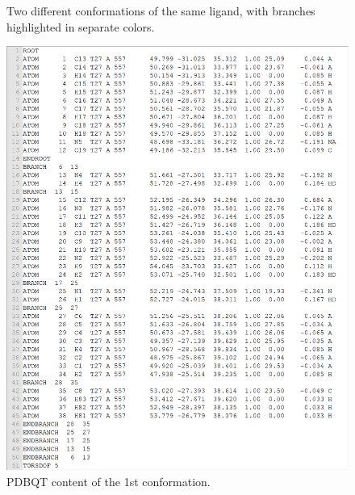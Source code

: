 \begin{figure}
\centering
{}
\caption{Two different conformations of the same ligand, with branches highlighted in separate colors.}
\label{usr:T27Structures}
\end{figure}

\begin{figure}
\centering
\includegraphics[width=\linewidth]{../usrt/T27CrystalPDBQT.png}
\caption{PDBQT content of the 1st conformation.}
\label{usr:T27CrystalPDBQT}
\end{figure}

